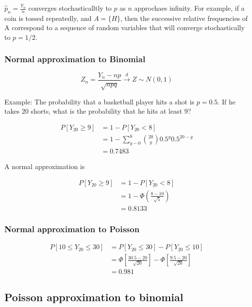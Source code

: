 \documentclass[]{book}
\begin{document}
\(\hat{p}_n=\frac{Y_n}{n}\) converges stochasticalltly to \(p\) as \(n\) approchaes infinity. For example, if a coin is tossed repeatedly, and \(A=\{H\}\), then the successive relative frequencies of A correspond to a sequence of random variables that will converge stochastically to \(p=1/2\).

\hypertarget{normal-approximation-to-binomial}{%
\subsubsection{Normal approximation to Binomial}\label{normal-approximation-to-binomial}}

\[Z_n=\frac{Y_n-np}{\sqrt{npq}} \xrightarrow{d} Z \sim N(0, 1)\]

Example: The probability that a basketball player hits a shot is \(p=0.5\). If he takes 20 shorts, what is the probability that he hits at least 9?

\[\begin{aligned} P[Y_{20} \geq 9] &=1-P[Y_{20} < 8] \\ &=1- \sum_{y-0}^8 \binom{20}{y} 0.5^y0.5^{20-y} \\&=0.7483 \end{aligned} \]

A normal approximation is

\[\begin{aligned} P[Y_{20} \geq 9] &=1-P[Y_{20}<8] \\ &=1- \Phi(\frac{8-10}{\sqrt{5}}) \\&=0.8133 \end{aligned} \]

\hypertarget{normal-approximation-to-poisson}{%
\subsubsection{Normal approximation to Poisson}\label{normal-approximation-to-poisson}}

\[\begin{aligned} P[10\leq Y_{20} \leq 30] &=P[ Y_{20} \leq 30]-P[ Y_{20} \leq 10] \\&=\Phi[\frac{30.5-20}{\sqrt{20}}]-\Phi[\frac{9.5-20}{\sqrt{20}}] \\ &=0.981 \end{aligned}\]

\hypertarget{poisson-approximation-to-binomial}{%
\subsection{Poisson approximation to binomial}\label{poisson-approximation-to-binomial}}
\end{document}

